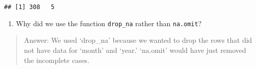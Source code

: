 \documentclass[]{article}
\providecommand{\tightlist}{%
  \setlength{\itemsep}{0pt}\setlength{\parskip}{0pt}}
\begin{document}
\begin{verbatim}
## [1] 308   5
\end{verbatim}

\begin{enumerate}
\def\labelenumi{\arabic{enumi}.}
\setcounter{enumi}{13}
\tightlist
\item
  Why did we use the function \texttt{drop\_na} rather than
  \texttt{na.omit}?
\end{enumerate}

\begin{quote}
Answer: We used `drop\_na' because we wanted to drop the rows that did
not have data for `month' and `year.' `na.omit' would have just removed
the incomplete cases.
\end{quote}
\end{document}
